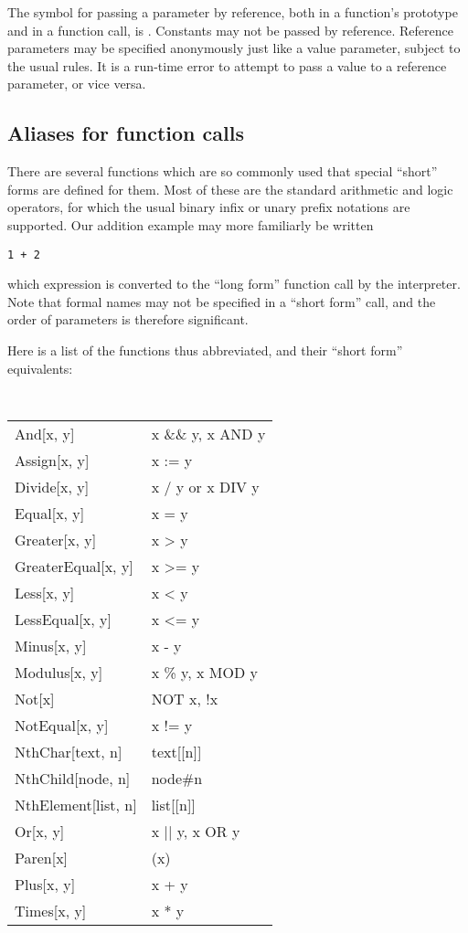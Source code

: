 The symbol for passing a parameter by reference, both in a function's
prototype and in a function call, is {\tt <->}.  Constants may not be
passed by reference.  Reference parameters may be specified anonymously
just like a value parameter, subject to the usual rules.  It is a run-time
error to attempt to pass a value to a reference parameter, or vice versa.

\subsection{Aliases for function calls}

There are several functions which are so commonly used that special
``short'' forms are defined for them.  Most of these are the
standard arithmetic and logic operators, for which the usual binary
infix or unary prefix notations are supported.  Our addition example
may more familiarly be written

\begin{verbatim}
1 + 2
\end{verbatim}

\noindent which expression is converted to the ``long form'' function
call by the interpreter.  Note that formal names may not be specified
in a ``short form'' call, and the order of parameters is therefore
significant.

Here is a list of the functions thus abbreviated, and their ``short form''
equivalents:

\medskip

{\tt
\begin{tabular}{lp{4in}}
And[x, y]		& x \&\& y, x AND y \\
Assign[x, y]		& x := y \\
Divide[x, y]		& x / y or x DIV y \\
Equal[x, y]		& x = y \\
Greater[x, y]		& x > y \\
GreaterEqual[x, y]	& x >= y \\
Less[x, y]		& x < y \\
LessEqual[x, y]		& x <= y \\
Minus[x, y]		& x - y \\
Modulus[x, y]		& x \% y, x MOD y \\
Not[x]			& NOT x, !x \\
NotEqual[x, y]		& x != y \\
NthChar[text, n]	& text[[n]] \\
NthChild[node, n]	& node\#n \\ 
NthElement[list, n]	& list[[n]] \\
Or[x, y]		& x || y, x OR y \\
Paren[x]		& (x) \\ 
Plus[x, y]		& x + y \\
Times[x, y]		& x * y \\
\end{tabular}
}


